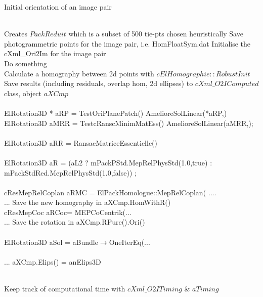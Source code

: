 \begin{algorithm}
\caption{ Initial orientation of an image pair}
\begin{algorithmic}
\\
\State  Creates $PackReduit$ which is a subset of 500 tie-pts chosen heuristically
\State  Save photogrammetric points for the image pair, i.e. HomFloatSym.dat
\State  Initialise the cXml\_Ori2Im for the image pair
\\
\State Do something
\EndIf
\\
\State Calculate a homography between 2d points with $cElHomographie::RobustInit$
\State Save results (including residuals, overlap hom, 2d ellipses) to $cXml\_O2IComputed$ class, object $aXCmp$
\\
\\
\Comment {}
\State ElRotation3D  * aRP = TestOriPlanePatch()
\State AmelioreSolLinear(*aRP,)
\EndIf
\\
\Comment {}
\State ElRotation3D aMRR = TestcRanscMinimMatEss()
\State AmelioreSolLinear(aMRR,);
\\
\\
\Comment {}
\State ElRotation3D aRR = RansacMatriceEssentielle()
\\
\\
\Comment {}
\State ElRotation3D aR =  (aL2 ? mPackPStd.MepRelPhysStd(1.0,true)  : mPackStdRed.MepRelPhysStd(1.0,false)) ;
\\
\\
\Comment {}
\State cResMepRelCoplan aRMC =  ElPackHomologue::MepRelCoplan( .... \\ ...
\State Save the new homography in aXCmp.HomWithR()
\\
\Comment {}
\State cResMepCoc aRCoc= MEPCoCentrik(... \\ ... 
\State Save the rotation in aXCmp.RPure().Ori()
\\
\\
\Comment {}
\State ElRotation3D aSol = aBundle$\rightarrow$OneIterEq(...
\\
\\
\Comment {}
\State ... aXCmp.Elips() = anElips3D

\\
\State Keep track of computational time with $cXml\_O2ITiming$ \& $aTiming$

\end{algorithmic}\label{alg:OrInit2Im}
\end{algorithm}
%

